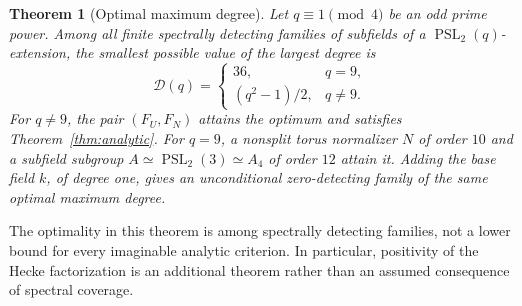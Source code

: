 \documentclass[11pt]{article}
\newtheorem{theorem}{Theorem}[section]
\theoremstyle{remark}\newtheorem{remark}[theorem]{Remark}
\newcommand{\PSL}{\operatorname{PSL}}
\begin{document}
\begin{theorem}[Optimal maximum degree]\label{thm:optimal}
Let $q\equiv1\pmod4$ be an odd prime power. Among all finite spectrally
detecting families of subfields of a $\PSL_2(q)$-extension, the smallest
possible value of the largest degree is
\begin{equation}\label{eq:opt}
 \mathcal D(q)=
 \begin{cases}
 36,&q=9,\\
 (q^2-1)/2,&q\ne9.
 \end{cases}
\end{equation}
For $q\ne9$, the pair $(F_U,F_N)$ attains the optimum and satisfies
Theorem~\ref{thm:analytic}. For $q=9$, a nonsplit torus normalizer $N$ of
order $10$ and a subfield subgroup $A\simeq\PSL_2(3)\simeq A_4$ of order
$12$ attain it. Adding the base field $k$, of degree one, gives an
unconditional zero-detecting family of the same optimal maximum degree.
\end{theorem}

The optimality in this theorem is among spectrally detecting families, not
a lower bound for every imaginable analytic criterion. In particular,
positivity of the Hecke factorization is an additional theorem rather than
an assumed consequence of spectral coverage.
\end{document}
